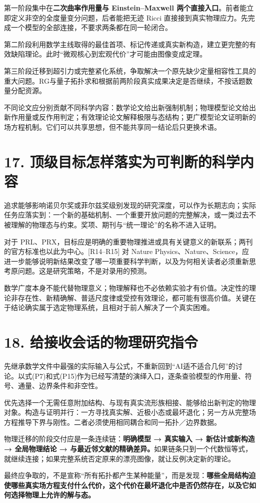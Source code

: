 \documentclass[UTF8,a4paper,11pt,fontset=fandol]{ctexart}
\begin{document}
第一阶段集中在\textbf{二次曲率作用量与 Einstein--Maxwell
两个直接入口}。前者能立即定义非空的全度量变分问题，后者能把无迹 Ricci
直接接到真实物理应力。先完成一个模型的全部连接，不要求两条都在同一轮闭合。

第二阶段利用数学主线取得的最佳首项、标记传递或真实新构造，建立更完整的有效缺陷理论。此时``微观核心到宏观代价''才可能由图像变成定理。

第三阶段迁移到超引力或完整紧化系统，争取解决一个原先缺少定量相容性工具的重大问题。RG与量子拓扑求和根据前两阶段真实成果决定是否继续，不按话题数量分配资源。

不同论文应分别贡献不同科学内容：数学论文给出新强制机制；物理模型论文给出新作用量或反作用判定；有效理论论文解释极限与态结构；更广模型论文证明新的场方程机制。它们可以共享思想，但不能共享同一结论后只更换术语。

\section{17.
顶级目标怎样落实为可判断的科学内容}\label{ux9876ux7ea7ux76eeux6807ux600eux6837ux843dux5b9eux4e3aux53efux5224ux65adux7684ux79d1ux5b66ux5185ux5bb9}

追求能够影响诺贝尔奖或菲尔兹奖级别发现的研究深度，可以作为长期志向；实际任务应落实到：一个新的基础机制、一个重要开放问题的完整解决，或一类过去不被理解的物理态与约束。奖项、期刊与``统一理论''的名称不进入证明。

对于
PRL、PRX，目标应是明确的重要物理推进或具有关键意义的新联系；两刊的官方标准也以此为中心。{[}R14--R15{]}
对 Nature
Physics、Nature、Science，应进一步能够说明新结果改变了哪一项重要科学判断，以及为何相关读者必须重新思考原问题。这是研究策略，不是对录用的预测。

数学广度本身不能代替物理意义；物理解释也不必依赖实验才有价值。决定性的理论非存在性、新精确解、普适尺度律或受控有效理论，都可能有很高价值。关键在于结论确实属于选定物理系统，且相对于前人解决了一个真实困难。

\section{18.
给接收会话的物理研究指令}\label{ux7ed9ux63a5ux6536ux4f1aux8bddux7684ux7269ux7406ux7814ux7a76ux6307ux4ee4}

先继承数学文件中最强的实际输入与公式，不重新回到``AI适不适合几何''的讨论。以式(P7)和式(P15)作为已经写清楚的演绎入口，逐条查验模型的作用量、符号、通量、边界条件和非空性。

优先选择一个无需任意附加结构、与现有真实流形族相接、能够给出新判定的物理对象。构造与证明并行：一方寻找真实解、近极小态或最坏退化；另一方从完整场方程推导下界与刚性。二者必须使用相同耦合和同一拓扑／边界数据。

物理迁移的阶段交付应是一条连续链：\textbf{明确模型 → 真实输入 →
新估计或新构造 → 全局物理结论 →
与最近邻文献的精确差异。}如果链条只到一个代数恒等式，就继续连接；如果完整系统否定原来的漂亮图像，就让反例决定新的理论。

最终应争取的，不是宣称``所有拓扑都产生某种能量''，而是发现：\textbf{哪些全局结构迫使哪些真实场方程支付什么代价，这个代价在最坏退化中是否仍然存在，以及它如何选择物理上允许的解与态。}
\end{document}
